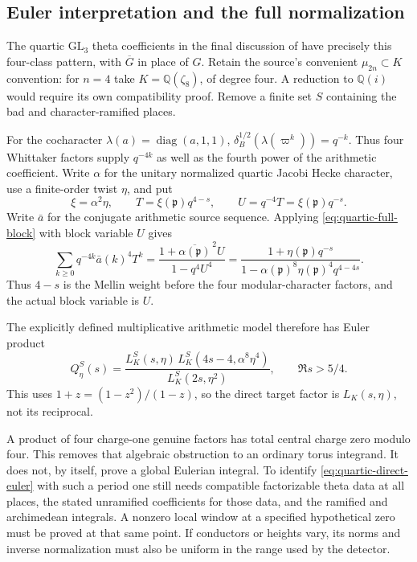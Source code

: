 \documentclass[11pt]{article}
\begin{document}
\subsection{Euler interpretation and the full normalization}
The quartic $\mathrm{GL}_3$ theta coefficients in the final discussion
of \cite{FGGlobal} have precisely this four-class pattern, with
$\overline G$ in place of $G$. Retain the source's convenient
$\mu_{2n}\subset K$ convention: for $n=4$ take
$K=\mathbb Q(\zeta_8)$, of degree four. A reduction to
$\mathbb Q(i)$ would require its own compatibility proof. Remove a
finite set $S$ containing the bad and character-ramified places.

For the cocharacter $\lambda(a)=\operatorname{diag}(a,1,1)$,
$\delta_B^{1/2}(\lambda(\varpi^k))=q^{-k}$. Thus four Whittaker
factors supply $q^{-4k}$ as well as the fourth power of the arithmetic
coefficient. Write $\alpha$ for the unitary normalized quartic Jacobi
Hecke character, use a finite-order twist $\eta$, and put
\[
 \xi=\alpha^2\eta,\qquad T=\xi(\mathfrak p)q^{4-s},
 \qquad U=q^{-4}T=\xi(\mathfrak p)q^{-s}.
\]
Write $\bar a$ for the conjugate arithmetic source sequence. Applying
\eqref{eq:quartic-full-block} with block variable $U$ gives
\[
 \sum_{k\ge0}q^{-4k}\bar a(k)^4T^k
 =\frac{1+\overline{\alpha(\mathfrak p)}^{\,2}U}{1-q^4U^4}
 =\frac{1+\eta(\mathfrak p)q^{-s}}
        {1-\alpha(\mathfrak p)^8\eta(\mathfrak p)^4q^{4-4s}}.
\]
Thus $4-s$ is the Mellin weight before the four
modular-character factors, and the actual block variable is $U$.

The explicitly defined multiplicative arithmetic model therefore has
Euler product
\begin{equation}\label{eq:quartic-direct-euler}
 Q_\eta^S(s)=
 \frac{L_K^S(s,\eta)\,
       L_K^S(4s-4,\alpha^8\eta^4)}
      {L_K^S(2s,\eta^2)},\qquad \Re s>5/4 .
\end{equation}
This uses $1+z=(1-z^2)/(1-z)$, so the direct target factor is
$L_K(s,\eta)$, not its reciprocal.

A product of four charge-one genuine factors has total central charge
zero modulo four. This removes that algebraic obstruction to an
ordinary torus integrand. It does not, by itself, prove a global
Eulerian integral. To identify \eqref{eq:quartic-direct-euler} with
such a period one still needs compatible factorizable theta data at
all places, the stated unramified coefficients for those data, and the
ramified and archimedean integrals. A nonzero local window at a
specified hypothetical zero must be proved at that same point.
If conductors or heights vary, its norms and inverse normalization
must also be uniform in the range used by the detector.
\end{document}
